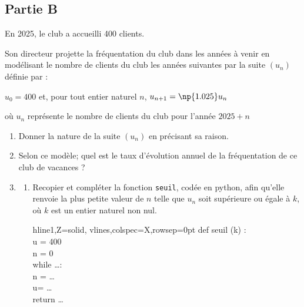\subsection*{Partie B}
En 2025, le club a accueilli 400 clients.

Son directeur projette la fréquentation du club dans les années à venir en modélisant le nombre de clients du club les années suivantes par la suite \mbox{$(u_n)$} définie par :

\begin{center}
	\mbox{$u_0=400$} \quad et, pour tout entier naturel $n$, \quad \mbox{$u_{n+1}=\np{1.025}u_n$}
\end{center}

où $u_n$ représente le nombre de clients du club pour l'année \mbox{$2025+n$}
\begin{enumerate}
	\item Donner la nature de la suite $(u_n)$ en précisant sa raison.
	\item Selon ce modèle; quel est le taux d'évolution annuel de la fréquentation de ce club de vacances ?
	\item
	 \begin{enumerate}
	\item
	\begin{minipage}[t]{0.66\linewidth}\vspace{0mm}
		Recopier et compléter la fonction \texttt{seuil}, codée en python, afin qu'elle renvoie la plus petite valeur de $n$ telle que $u_n$ soit supérieure ou égale à $k$, où $k$ est un entier naturel non nul.

\end{minipage}
\hspace{0.05\linewidth}
	\begin{minipage}[t]{0.33\linewidth}\vspace{0cm}
\begin{ttfamily}%
\begin{tblr}{hline{1,Z}={solid}, vlines,colspec={X},rowsep=0pt}%
	def seuil (k) :\\
	\qquad u = 400\\
	\qquad n = 0\\
	\qquad while  \dots :\\
	\qquad\qquad  n = \dots\\
	\qquad\qquad  u= \dots\\
	\qquad return \dots\\
\end{tblr}
\end{ttfamily}
\end{minipage}


\end{enumerate}
\end{enumerate}
